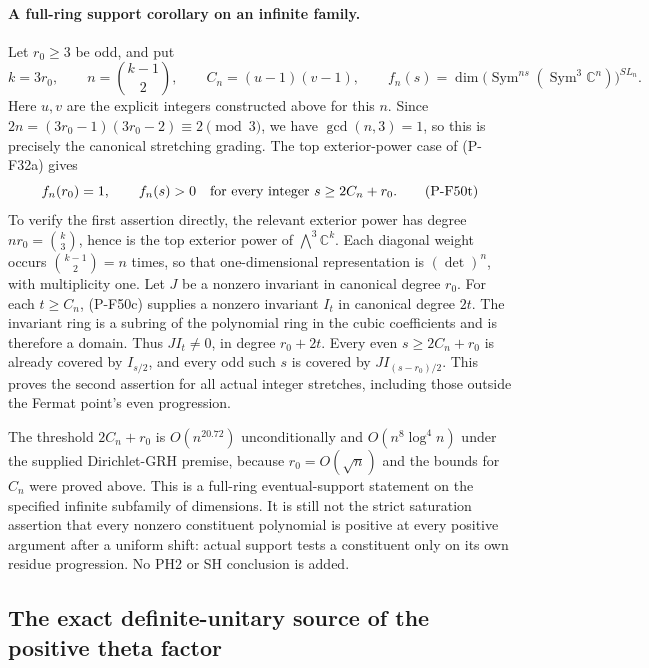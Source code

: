 \documentclass[11pt,a4paper]{article}
\begin{document}
\paragraph{A full-ring support corollary on an infinite family.}
Let $r_0\ge3$ be odd, and put
\[
       k=3r_0,\qquad n=\binom{k-1}{2},\qquad
       C_n=(u-1)(v-1),
       \qquad f_n(s)=\dim\bigl(\operatorname{Sym}^{ns}
                    (\operatorname{Sym}^3\mathbb C^n)\bigr)^{SL_n}.
                                                        \tag{P-F50s}
\]
Here $u,v$ are the explicit integers constructed above for this $n$.
Since $2n=(3r_0-1)(3r_0-2)\equiv2\pmod3$, we have
$\gcd(n,3)=1$, so this is precisely the canonical stretching
grading. The top exterior-power case of (P-F32a) gives
\[
               f_n(r_0)=1,
      \qquad f_n(s)>0\quad\hbox{for every integer }
                           s\ge2C_n+r_0.              \tag{P-F50t}
\]
To verify the first assertion directly, the relevant exterior
power has degree $nr_0=\binom{k}{3}$, hence is the top exterior
power of $\bigwedge^3\mathbb C^k$. Each diagonal weight occurs
$\binom{k-1}{2}=n$ times, so that one-dimensional representation
is $(\det)^n$, with multiplicity one. Let $J$ be a nonzero
invariant in canonical degree $r_0$. For each $t\ge C_n$,
(P-F50c) supplies a nonzero invariant $I_t$ in canonical
degree $2t$. The invariant ring is a subring of the polynomial
ring in the cubic coefficients and is therefore a domain.
Thus $JI_t\ne0$, in degree $r_0+2t$.
Every even $s\ge2C_n+r_0$ is already covered by $I_{s/2}$,
and every odd such $s$ is covered by $JI_{(s-r_0)/2}$.
This proves the second assertion for all actual integer stretches,
including those outside the Fermat point's even progression.

The threshold $2C_n+r_0$ is $O(n^{20.72})$ unconditionally
and $O(n^8\log^4 n)$ under the supplied Dirichlet-GRH premise,
because $r_0=O(\sqrt n)$ and the bounds for $C_n$ were proved
above. This is a full-ring eventual-support statement on the
specified infinite subfamily of dimensions. It is still not
the strict saturation assertion that every nonzero constituent
polynomial is positive at every positive argument after a
uniform shift: actual support tests a constituent only on its
own residue progression. No PH2 or SH conclusion is added.


\subsection{The exact definite-unitary source of the positive theta factor}
\label{sec:definite-theta-factor}
\end{document}

